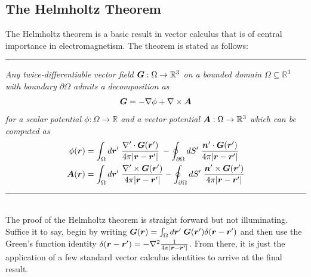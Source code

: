 \documentclass[twocolumn]{gwclass}
\newcommand{\R}{\mathbb{R}}
\begin{document}
	\subsection{The Helmholtz Theorem}
	The Helmholtz theorem is a basic result in vector calculus that is of central importance in electromagnetism. The theorem is stated as follows:
	\\
	\rule{\columnwidth}{0.5pt}
	\emph{Any twice-differentiable vector field $\*G:\Omega\to\R^3$ on a bounded domain $\Omega\subseteq\R^3$ with boundary $\partial\Omega$ admits a decomposition as}
	$$ \boldsymbol{G} = -\nabla\phi + \nabla\times\boldsymbol{A} $$
	\emph{for a scalar potential $\phi:\Omega\to\R$ and a vector potential $\*A:\Omega\to\R^3$ which can be computed as}
	\begin{align*}
		\phi(\boldsymbol{r}) &= \int_\Omega d\boldsymbol{r}'\;\frac{\nabla'\cdot\boldsymbol{G}(\boldsymbol{r}')}{4\pi\abs{\boldsymbol{r}-\boldsymbol{r}'}} \:- \oint_{\partial\Omega}dS'\;\frac{\boldsymbol{n}'\cdot\boldsymbol{G}(\boldsymbol{r}')}{4\pi\abs{\boldsymbol{r}-\boldsymbol{r}'}} \\
		\boldsymbol{A}(\boldsymbol{r}) &= \int_\Omega d\boldsymbol{r}'\;\frac{\nabla'\times\boldsymbol{G}(\boldsymbol{r}')}{4\pi\abs{\boldsymbol{r}-\boldsymbol{r}'}} - \oint_{\partial\Omega}dS'\;\frac{\boldsymbol{n}'\times\boldsymbol{G}(\boldsymbol{r}')}{4\pi\abs{\boldsymbol{r}-\boldsymbol{r}'}} 
	\end{align*}
	\rule{\columnwidth}{0.5pt}
	\\
	The proof of the Helmholtz theorem is straight forward but not illuminating. Suffice it to say, begin by writing $\boldsymbol{G}(\boldsymbol{r}) = \int_\Omega d\boldsymbol{r}'\;\boldsymbol{G}(\boldsymbol{r}')\delta(\boldsymbol{r}-\boldsymbol{r}')$ and then use the Green's function identity $\delta(\boldsymbol{r}-\boldsymbol{r}')=-\nabla^2\frac{1}{4\pi\abs{\boldsymbol{r}-\boldsymbol{r}'}}$. From there, it is just the application of a few standard vector calculus identities to arrive at the final result.
\end{document}
